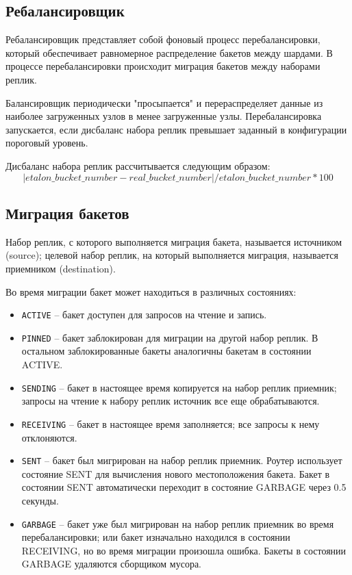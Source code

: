 \subsection{Ребалансировщик}

Ребалансировщик представляет собой фоновый процесс перебалансировки, который
обеспечивает равномерное распределение бакетов между шардами. В процессе
перебалансировки происходит миграция бакетов между наборами реплик.

Балансировщик периодически "просыпается" и перераспределяет данные из наиболее
загруженных узлов в менее загруженные узлы. Перебалансировка запускается, если
дисбаланс набора реплик превышает заданный в конфигурации пороговый уровень.

Дисбаланс набора реплик рассчитывается следующим образом:
\begin{equation}
|etalon\_bucket\_number - real\_bucket\_number| / etalon\_bucket\_number * 100
\end{equation}

\subsection{Миграция бакетов}

Набор реплик, с которого выполняется миграция бакета, называется
источником (source); целевой набор реплик, на который выполняется
миграция, называется приемником (destination).

Во время миграции бакет может находиться в различных состояниях:

\begin{itemize}
\item \texttt{ACTIVE} -- бакет доступен для запросов на чтение и запись.
\item \texttt{PINNED} -- бакет заблокирован для миграции на другой набор
    реплик. В остальном заблокированные бакеты аналогичны бакетам в состоянии
        ACTIVE.
\item \texttt{SENDING} -- бакет в настоящее время копируется на набор реплик
    приемник; запросы на чтение к набору реплик источник все еще
        обрабатываются.
\item \texttt{RECEIVING} -- бакет в настоящее время заполняется; все запросы к
    нему отклоняются.
\item \texttt{SENT} -- бакет был мигрирован на набор реплик приемник. Роутер
    использует состояние SENT для вычисления нового местоположения бакета.
        Бакет в состоянии SENT автоматически переходит в состояние GARBAGE
        через 0.5 секунды.
\item \texttt{GARBAGE} -- бакет уже был мигрирован на набор реплик приемник во
    время перебалансировки; или бакет изначально находился в состоянии
        RECEIVING, но во время миграции произошла ошибка. Бакеты в состоянии
        GARBAGE удаляются сборщиком мусора.
\end{itemize}

